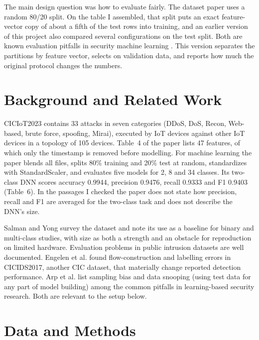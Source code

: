 \documentclass[conference]{IEEEtran}
\begin{document}
The main design question was how to evaluate fairly. The dataset paper uses a random 80/20 split. On the table I assembled, that split puts an exact feature-vector copy of about a fifth of the test rows into training, and an earlier version of this project also compared several configurations on the test split. Both are known evaluation pitfalls in security machine learning \cite{arp2022dos}. This version separates the partitions by feature vector, selects on validation data, and reports how much the original protocol changes the numbers.

\section{Background and Related Work}
CICIoT2023 \cite{s23135941} contains 33 attacks in seven categories (DDoS, DoS, Recon, Web-based, brute force, spoofing, Mirai), executed by IoT devices against other IoT devices in a topology of 105 devices. Table~4 of the paper lists 47 features, of which only the timestamp is removed before modelling. For machine learning the paper blends all files, splits 80\% training and 20\% test at random, standardizes with StandardScaler, and evaluates five models for 2, 8 and 34 classes. Its two-class DNN scores accuracy 0.9944, precision 0.9476, recall 0.9333 and F1 0.9403 (Table~6). In the passages I checked the paper does not state how precision, recall and F1 are averaged for the two-class task and does not describe the DNN's size.

Salman and Yong \cite{salman2025overview} survey the dataset and note its use as a baseline for binary and multi-class studies, with size as both a strength and an obstacle for reproduction on limited hardware. Evaluation problems in public intrusion datasets are well documented. Engelen et al. \cite{engelen2021troubleshooting} found flow-construction and labelling errors in CICIDS2017, another CIC dataset, that materially change reported detection performance. Arp et al. \cite{arp2022dos} list sampling bias and data snooping (using test data for any part of model building) among the common pitfalls in learning-based security research. Both are relevant to the setup below.

\section{Data and Methods}
\end{document}
